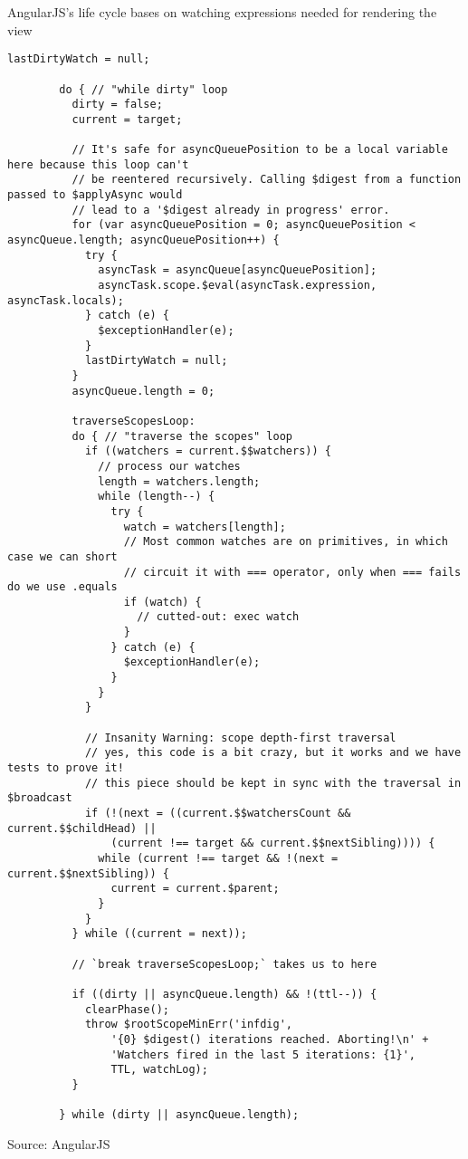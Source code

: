 \documentclass[inzynier,druk,ramka]{build/dyplom}
\begin{document}
AngularJS's life cycle bases on watching expressions needed for rendering the view \cite{angularlifecycle}

\begin{lstlisting}
lastDirtyWatch = null;

        do { // "while dirty" loop
          dirty = false;
          current = target;

          // It's safe for asyncQueuePosition to be a local variable here because this loop can't
          // be reentered recursively. Calling $digest from a function passed to $applyAsync would
          // lead to a '$digest already in progress' error.
          for (var asyncQueuePosition = 0; asyncQueuePosition < asyncQueue.length; asyncQueuePosition++) {
            try {
              asyncTask = asyncQueue[asyncQueuePosition];
              asyncTask.scope.$eval(asyncTask.expression, asyncTask.locals);
            } catch (e) {
              $exceptionHandler(e);
            }
            lastDirtyWatch = null;
          }
          asyncQueue.length = 0;

          traverseScopesLoop:
          do { // "traverse the scopes" loop
            if ((watchers = current.$$watchers)) {
              // process our watches
              length = watchers.length;
              while (length--) {
                try {
                  watch = watchers[length];
                  // Most common watches are on primitives, in which case we can short
                  // circuit it with === operator, only when === fails do we use .equals
                  if (watch) {
                    // cutted-out: exec watch
                  }
                } catch (e) {
                  $exceptionHandler(e);
                }
              }
            }

            // Insanity Warning: scope depth-first traversal
            // yes, this code is a bit crazy, but it works and we have tests to prove it!
            // this piece should be kept in sync with the traversal in $broadcast
            if (!(next = ((current.$$watchersCount && current.$$childHead) ||
                (current !== target && current.$$nextSibling)))) {
              while (current !== target && !(next = current.$$nextSibling)) {
                current = current.$parent;
              }
            }
          } while ((current = next));

          // `break traverseScopesLoop;` takes us to here

          if ((dirty || asyncQueue.length) && !(ttl--)) {
            clearPhase();
            throw $rootScopeMinErr('infdig',
                '{0} $digest() iterations reached. Aborting!\n' +
                'Watchers fired in the last 5 iterations: {1}',
                TTL, watchLog);
          }

        } while (dirty || asyncQueue.length);
\end{lstlisting}
Source: AngularJS \cite{angulardigest}
\end{document}
